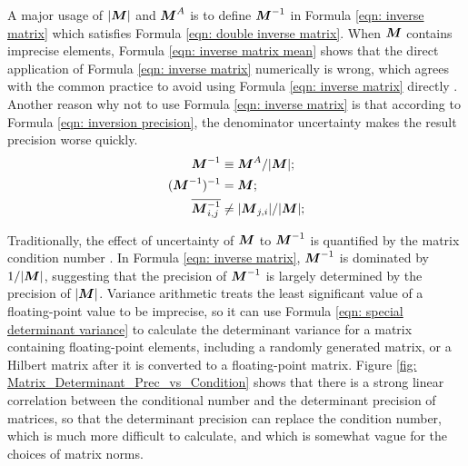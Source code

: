 \documentclass[twoside]{article}
\numberwithin{equation}{section}
\begin{document}
A major usage of $|\protect{\textrm{\boldmath $M$}}|$ and $\protect{\textrm{\boldmath $M$}}^A$ is to define $\protect{\textrm{\boldmath $M$}}^{-1}$ in Formula \eqref{eqn: inverse matrix} which satisfies Formula \eqref{eqn: double inverse matrix}.
When $\protect{\textrm{\boldmath $M$}}$ contains imprecise elements, Formula \eqref{eqn: inverse matrix mean} shows that the direct application of Formula \eqref{eqn: inverse matrix} numerically is wrong, which agrees with the common practice to avoid using Formula \eqref{eqn: inverse matrix} directly \cite{Numerical_Recipes}.
Another reason why not to use Formula \eqref{eqn: inverse matrix} is that according to Formula \eqref{eqn: inversion precision}, the denominator uncertainty makes the result precision worse quickly.
\begin{align}
\label{eqn: inverse matrix}
\protect{\textrm{\boldmath $M$}}^{-1} &\equiv \protect{\textrm{\boldmath $M$}}^A / |\protect{\textrm{\boldmath $M$}}|; \\
\label{eqn: double inverse matrix}
(\protect{\textrm{\boldmath $M$}}^{-1})^{-1} &= \protect{\textrm{\boldmath $M$}}; \\
\label{eqn: inverse matrix mean}
\overline{\protect{\textrm{\boldmath $M$}}_{i,j}^{-1}} &\ne |\protect{\textrm{\boldmath $M$}}_{j,i}| /|\protect{\textrm{\boldmath $M$}}|;
\end{align}

Traditionally, the effect of uncertainty of  $\protect{\textrm{\boldmath $M$}}$ to $\protect{\textrm{\boldmath $M$}}^{-1}$ is quantified by the matrix condition number \cite{Linear_Algebra}.
In Formula \eqref{eqn: inverse matrix}, $\protect{\textrm{\boldmath $M$}}^{-1}$ is dominated by $1/|\protect{\textrm{\boldmath $M$}}|$, suggesting that the precision of $\protect{\textrm{\boldmath $M$}}^{-1}$ is largely determined by the precision of $|\protect{\textrm{\boldmath $M$}}|$.
Variance arithmetic treats the least significant value of a floating-point value to be imprecise, so it can use Formula \eqref{eqn: special determinant variance} to calculate the determinant variance for a matrix containing floating-point elements, including a randomly generated matrix, or a Hilbert matrix \cite{Linear_Algebra} after it is converted to a floating-point matrix.
Figure \ref{fig: Matrix_Determinant_Prec_vs_Condition} shows that there is a strong linear correlation between the conditional number and the determinant precision of matrices, so that the determinant precision can replace the condition number, which is much more difficult to calculate, and which is somewhat vague for the choices of matrix norms.
\end{document}
